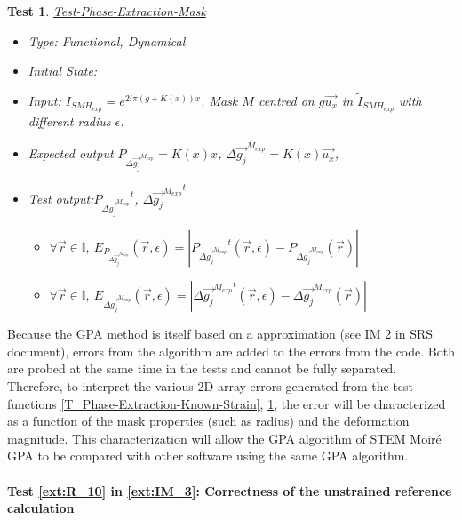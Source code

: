 \documentclass[12pt, titlepage]{article}
\newcommand{\progname}{STEM Moir{\'e} GPA}
\newtheorem{Test}{Test}
\begin{document}
\begin{Test}\normalfont\underline{Test-Phase-Extraction-Mask}
\label{T_Phase-Extraction-Mask}
\begin{itemize}
\item Type: Functional, Dynamical
\item Initial State:
\item Input: $I_{SMH_{exp}}=e^{2i\pi (g+K(x))x}$, Mask $M$ centred on $g\overrightarrow{u_x}$ in $\widetilde{I}_{SMH_{exp}}$ with different radius $\epsilon$. 
\item Expected output $P_{\Delta \overrightarrow{g_{j}}^{M_{exp}}}=K(x)x$, $\Delta \overrightarrow{g_{j}}^{M_{exp}}=K(x)\overrightarrow{u_x}$, 
\item Test output:${P_{\Delta \overrightarrow{g_{j}}^{M_{exp}}}}^{t}$, $\Delta {\overrightarrow{g_{j}}^{M_{exp}}}^{t}$
	\begin{itemize}
	\item $\forall \vec{r} \in \mathbb{I}, \ E_{P_{\Delta \overrightarrow{g_{j}}^{M_{exp}}}}(\vec{r},\epsilon)=|{P_{\Delta \overrightarrow{g_{j}}^{M_{exp}}}}^{t}(\vec{r},\epsilon)-P_{\Delta \overrightarrow{g_{j}}^{M_{exp}}}(\vec{r})|$
	\item $\forall \vec{r} \in \mathbb{I}, \ E_{\Delta {\overrightarrow{g_{j}}^{M_{exp}}}}(\vec{r},\epsilon)=|{\Delta {\overrightarrow{g_{j}}^{M_{exp}}}}^t(\vec{r},\epsilon)-{\Delta {\overrightarrow{g_{j}}^{M_{exp}}}}(\vec{r})|$
	\end{itemize}
\end{itemize}
\end{Test}						

Because the GPA method is itself based on a approximation (see IM 2 in SRS document), errors from the algorithm are added to the errors from the code. Both are probed at the same time in the tests and cannot be fully separated. Therefore, to interpret the various 2D array errors generated from the test functions \cref{T_Phase-Extraction-Known-Strain}, \cref{T_Phase-Extraction-Mask}, the error will be characterized as a function of the mask properties (such as radius) and the deformation magnitude. This characterization will allow the GPA algorithm of \progname{} to be compared with other software using the same GPA algorithm.

\paragraph{Test \cref{ext:R_10} in \cref{ext:IM_3}: Correctness of the unstrained reference calculation}	
\end{document}
